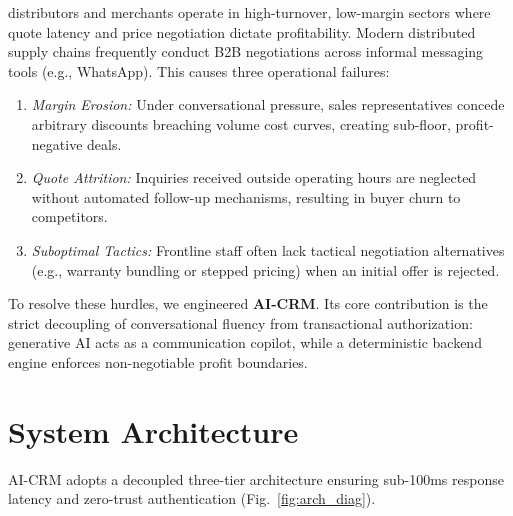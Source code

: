 \documentclass[conference]{IEEEtran}
\begin{document}
 distributors and merchants operate in high-turnover, low-margin sectors where quote latency and price negotiation dictate profitability. Modern distributed supply chains frequently conduct B2B negotiations across informal messaging tools (e.g., WhatsApp). This causes three operational failures:
\begin{enumerate}
    \item \emph{Margin Erosion:} Under conversational pressure, sales representatives concede arbitrary discounts breaching volume cost curves, creating sub-floor, profit-negative deals.
    \item \emph{Quote Attrition:} Inquiries received outside operating hours are neglected without automated follow-up mechanisms, resulting in buyer churn to competitors.
    \item \emph{Suboptimal Tactics:} Frontline staff often lack tactical negotiation alternatives (e.g., warranty bundling or stepped pricing) when an initial offer is rejected.
\end{enumerate}

To resolve these hurdles, we engineered \textbf{AI-CRM}. Its core contribution is the strict decoupling of conversational fluency from transactional authorization: generative AI acts as a communication copilot, while a deterministic backend engine enforces non-negotiable profit boundaries.

\section{System Architecture}
\label{sec:arch}

AI-CRM adopts a decoupled three-tier architecture ensuring sub-100ms response latency and zero-trust authentication (Fig.~\ref{fig:arch_diag}).
\end{document}
